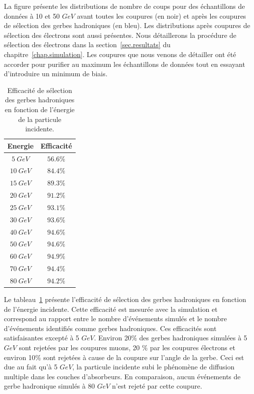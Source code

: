 La figure présente les distributions de nombre de coups pour des échantillons de données à 10 et 50 $GeV$ avant toutes les coupures (en noir) et après les coupures de sélection des gerbes hadroniques (en bleu). Les distributions après coupures de sélection des électrons sont aussi présentes. Nous détaillerons la procédure de sélection des électrons dans la section~\ref{sec.resultats} du chapitre~\ref{chap.simulation}. Les coupures que nous venons de détailler ont été accorder pour purifier au maximum les échantillons de données tout en essayant d'introduire un minimum de biais.
\begin{table}[!ht]
  \begin{center}
    \begin{tabular}{c|c}
      Energie & Efficacité \\
      \hline
      $5 ~GeV$ & $56.6\%$  \\
      $10~GeV$ & $84.4\%$ \\
      $15~GeV$ & $89.3\%$ \\
      $20~GeV$ & $91.2\%$ \\
      $25~GeV$ & $93.1\%$ \\
      $30~GeV$ & $93.6\%$ \\
      $40~GeV$ & $94.6\%$ \\
      $50~GeV$ & $94.6\%$ \\
      $60~GeV$ & $94.9\%$ \\
      $70~GeV$ & $94.4\%$ \\
      $80~GeV$ & $94.2\%$ \\
    \end{tabular}
  \end{center}  
  \caption{Efficacité de sélection des gerbes hadroniques en fonction de l'énergie de la particule incidente.}
  \label{tab.pi-selection}
\end{table}
Le tableau~\ref{tab.pi-selection} présente l'efficacité de sélection des gerbes hadroniques en fonction de l'énergie incidente. Cette efficacité est mesurée avec la simulation et correspond au rapport entre le nombre d'événements simulés et le nombre d'événements identifiés comme gerbes hadroniques. Ces efficacités sont satisfaisantes excepté à 5 $GeV$. Environ 20$\%$ des gerbes hadroniques simulées à 5 $GeV$ sont rejetées par les coupures muons, 20 $\%$ par les coupures électrons et environ 10$\%$ sont rejetées à cause de la coupure sur l'angle de la gerbe. Ceci est due au fait qu'à 5 $GeV$, la particule incidente subi le phénomène de diffusion multiple dans les couches d'absorbeurs. En comparaison, aucun événements de gerbe hadronique simulés à 80 $GeV$ n'est rejeté par cette coupure.
